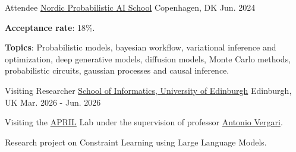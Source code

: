 \documentclass[11pt, a4paper]{awesome-cv}
\begin{document}
\begin{cventries}
  \cventry
    {Attendee} %
    {\href{https://nordic.probabilistic.ai/}{Nordic Probabilistic AI School}} %
    {Copenhagen, DK} %
    {Jun. 2024} %
    {
      \begin{cvitems}
        \item {\textbf{Acceptance rate}: 18\%.}
        \item {\textbf{Topics}: Probabilistic models, bayesian workflow, variational inference and optimization, deep generative models, diffusion models, Monte Carlo methods, probabilistic circuits, gaussian processes and causal inference.}
      \end{cvitems}
    }
  \cventry
    {Visiting Researcher}
    {\href{https://informatics.ed.ac.uk/}{School of Informatics, University of Edinburgh}}
    {Edinburgh, UK}
    {Mar. 2026 - Jun. 2026}
    {
      \begin{cvitems}
        \item {Visiting the \href{https://april-tools.github.io/}{APRIL} Lab under the supervision of professor \href{http://nolovedeeplearning.com/}{Antonio Vergari}.}
        \item {Research project on Constraint Learning using Large Language Models.}
      \end{cvitems}
    }
\end{cventries}
\end{document}

